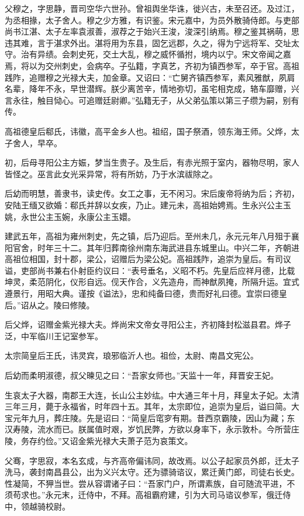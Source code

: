 \documentclass[12pt,UTF8]{ctexbook}
\begin{document}
父穆之，字思静，晋司空华六世孙。曾祖舆坐华诛，徙兴古，未至召还。及过江，为丞相掾，太子舍人。穆之少方雅，有识鉴。宋元嘉中，为员外散骑侍郎。与吏部尚书江湛、太子左率袁淑善，淑荐之于始兴王浚，浚深引纳焉。穆之鉴其祸萌，思违其难，言于湛求外出。湛将用为东县，固乞远郡，久之，得为宁远将军、交址太守。治有异绩。会刺史死，交土大乱，穆之威怀循拊，境内以宁。宋文帝闻之嘉焉，将以为交州刺史，会病卒。子弘籍，字真艺，齐初为镇西参军，卒于官。高祖践阼，追赠穆之光禄大夫，加金章。又诏曰：“亡舅齐镇西参军，素风雅猷，夙肩名辈，降年不永，早世潜辉。朕少离苦辛，情地弥切，虽宅相克成，辂车靡赠，兴言永往，触目恸心。可追赠廷尉卿。”弘籍无子，从父弟弘策以第三子缵为嗣，别有传。

高祖德皇后郗氏，讳徽，高平金乡人也。祖绍，国子祭酒，领东海王师。父烨，太子舍人，早卒。

初，后母寻阳公主方娠，梦当生贵子。及生后，有赤光照于室内，器物尽明，家人皆怪之。巫言此女光采异常，将有所妨，乃于水滨祓除之。

后幼而明慧，善隶书，读史传。女工之事，无不闲习。宋后废帝将纳为后；齐初，安陆王缅又欲婚：郗氏并辞以女疾，乃止。建元未，高祖始娉焉。生永兴公主玉姚，永世公主玉婉，永康公主玉嬛。

建武五年，高祖为雍州刺史，先之镇，后乃迎后。至州未几，永元元年八月殂于襄阳官舍，时年三十二。其年归葬南徐州南东海武进县东城里山。中兴二年，齐朝进高祖位相国，封十郡，梁公，诏赠后为梁公妃。高祖践阼，追崇为皇后。有司议谥，吏部尚书兼右仆射臣约议曰：“表号垂名，义昭不朽。先皇后应祥月德，比载坤灵，柔范阴化，仪形自远。伣天作合，义先造舟，而神猷夙掩，所隔升运。宜式遵景行，用昭大典。谨按《谥法》，忠和纯备曰德，贵而好礼曰德。宜崇曰德皇后。”诏从之。陵曰修陵。

后父烨，诏赠金紫光禄大夫。烨尚宋文帝女寻阳公主，齐初降封松滋县君。烨子泛，中军临川王记室参军。

太宗简皇后王氏，讳灵宾，琅邪临沂人也。祖俭，太尉、南昌文宪公。

后幼而柔明淑德，叔父暕见之曰：“吾家女师也。”天监十一年，拜晋安王妃。

生哀太子大器，南郡王大连，长山公主妙纮。中大通三年十月，拜皇太子妃。太清三年三月，薨于永福省，时年四十五。其年，太宗即位，追崇为皇后，谥曰简。大宝元年九月，葬庄陵。先是诏曰：“简皇后窀穸有期。昔西京霸陵，因山为藏；东汉寿陵，流水而已。朕属值时艰，岁饥民弊，方欲以身率下，永示敦朴。今所营庄陵，务存约俭。”又诏金紫光禄大夫萧子范为哀策文。

父骞，字思寂，本名玄成，与齐高帝偏讳同，故改焉。以公子起家员外郎，迁太子洗马，袭封南昌县公，出为义兴太守。还为骠骑谘议，累迁黄门郎，司徒右长史。性凝简，不狎当世。尝从容谓诸子曰：“吾家门户，所谓素族，自可随流平进，不须苟求也。”永元末，迁侍中，不拜。高祖霸府建，引为大司马谘议参军，俄迁侍中，领越骑校尉。
\end{document}
